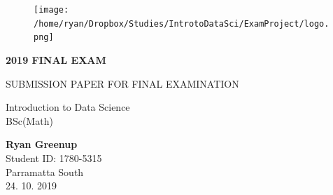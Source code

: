 \documentclass[11pt,a4paper,oneside]{article}
\begin{document}


\begin{titlepage}

    \begin{center}
           \begin{figure}
			\centering
			\texttt{[image: /home/ryan/Dropbox/Studies/IntrotoDataSci/ExamProject/logo.png]}
		\end{figure}

       \vspace*{1cm}

       \LARGE{ \textbf{   \uppercase{2019 Final Exam}   }}


       \large{   \uppercase{Submission Paper for Final Examination}   }

        \vspace{2cm}

         Introduction to Data Science \\ 
         \large{BSc(Math)}  \\ 

        \vspace{1cm}

         \textbf{Ryan Greenup}  \\ 
         Student ID: 1780-5315 \\ 
         Parramatta South  \\ 

         \vspace{1cm}
         24. 10. 2019 \\ 

        
         \vfill



     \end{center}
    \thispagestyle{empty}
\end{titlepage}

\newpage
\end{document}

